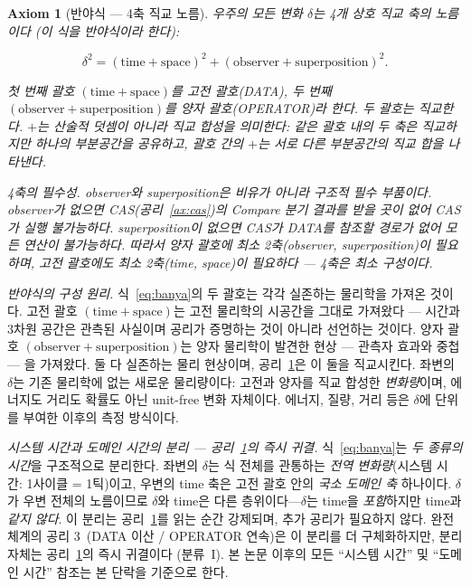 \documentclass[entropy,article,submit,pdftex,oneauthor]{Definitions/mdpi}
\newtheorem{Axiom}{Axiom}
\begin{document}
\begin{Axiom}[반야식 — 4축 직교 노름]\label{ax:banya}
우주의 모든 변화 $\delta$는 4개 상호 직교 축의 노름이다 (이 식을 \emph{반야식}이라 한다):
\begin{linenomath}
\begin{equation}
\delta^2 = (\mathrm{time} + \mathrm{space})^2 + (\mathrm{observer} + \mathrm{superposition})^2.
\label{eq:banya}
\end{equation}
\end{linenomath}
첫 번째 괄호 $(\mathrm{time} + \mathrm{space})$를 \emph{고전 괄호}(DATA), 두 번째 $(\mathrm{observer} + \mathrm{superposition})$를 \emph{양자 괄호}(OPERATOR)라 한다. 두 괄호는 직교한다. $+$는 산술적 덧셈이 아니라 직교 합성을 의미한다: 같은 괄호 내의 두 축은 직교하지만 하나의 부분공간을 공유하고, 괄호 간의 $+$는 서로 다른 부분공간의 직교 합을 나타낸다.

\emph{4축의 필수성.} observer와 superposition은 비유가 아니라 구조적 필수 부품이다. observer가 없으면 CAS(공리~\ref{ax:cas})의 Compare 분기 결과를 받을 곳이 없어 CAS가 실행 불가능하다. superposition이 없으면 CAS가 DATA를 참조할 경로가 없어 모든 연산이 불가능하다. 따라서 양자 괄호에 최소 2축(observer, superposition)이 필요하며, 고전 괄호에도 최소 2축(time, space)이 필요하다 --- 4축은 최소 구성이다.
\end{Axiom}

\emph{반야식의 구성 원리.} 식~\eqref{eq:banya}의 두 괄호는 각각 실존하는 물리학을 가져온 것이다. 고전 괄호 $(\mathrm{time} + \mathrm{space})$는 고전 물리학의 시공간을 그대로 가져왔다 --- 시간과 3차원 공간은 관측된 사실이며 공리가 증명하는 것이 아니라 선언하는 것이다. 양자 괄호 $(\mathrm{observer} + \mathrm{superposition})$는 양자 물리학이 발견한 현상 --- 관측자 효과와 중첩 --- 을 가져왔다. 둘 다 실존하는 물리 현상이며, 공리~\ref{ax:banya}은 이 둘을 직교시킨다. 좌변의 $\delta$는 기존 물리학에 없는 새로운 물리량이다: 고전과 양자를 직교 합성한 \emph{변화량}이며, 에너지도 거리도 확률도 아닌 unit-free 변화 자체이다. 에너지, 질량, 거리 등은 $\delta$에 단위를 부여한 이후의 측정 방식이다.

\emph{시스템 시간과 도메인 시간의 분리 --- 공리~\ref{ax:banya}의 즉시 귀결.}\label{rem:two-times} 식~\eqref{eq:banya}는 \emph{두 종류의 시간}을 구조적으로 분리한다. 좌변의 $\delta$는 식 전체를 관통하는 \emph{전역 변화량}(시스템 시간: 1사이클 = 1틱)이고, 우변의 time 축은 고전 괄호 안의 \emph{국소 도메인 축} 하나이다. $\delta$가 우변 전체의 노름이므로 $\delta$와 time은 다른 층위이다---$\delta$는 time을 \emph{포함}하지만 time과 \emph{같지 않다}. 이 분리는 공리~\ref{ax:banya}를 읽는 순간 강제되며, 추가 공리가 필요하지 않다. 완전 체계의 공리 3~\cite{han2026}(DATA 이산 / OPERATOR 연속)은 이 분리를 더 구체화하지만, 분리 자체는 공리~\ref{ax:banya}의 즉시 귀결이다 (분류~I). 본 논문 이후의 모든 ``시스템 시간'' 및 ``도메인 시간'' 참조는 본 단락을 기준으로 한다.
\end{document}
